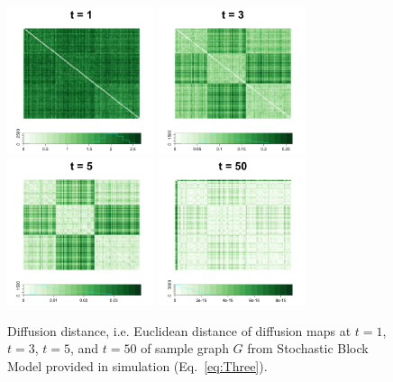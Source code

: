 \documentclass[12pt]{article}
\theoremstyle{definition}
\begin{document}
\begin{figure}[H]
	\centering
	\includegraphics[width=1.7in]{../Figure/Dx1.png}
	\includegraphics[width=1.7in]{../Figure/Dx3.png}
	\includegraphics[width=1.7in]{../Figure/Dx5.png}
	\includegraphics[width=1.7in]{../Figure/Dx50.png}
	\caption{Diffusion distance, i.e. Euclidean distance of diffusion maps at $t=1$, $t=3$, $t=5$, and $t=50$ of sample graph $G$ from Stochastic Block Model provided in simulation (Eq.~\ref{eq:Three}).}
	\label{fig:diffusions}
\end{figure}	
\end{document}
